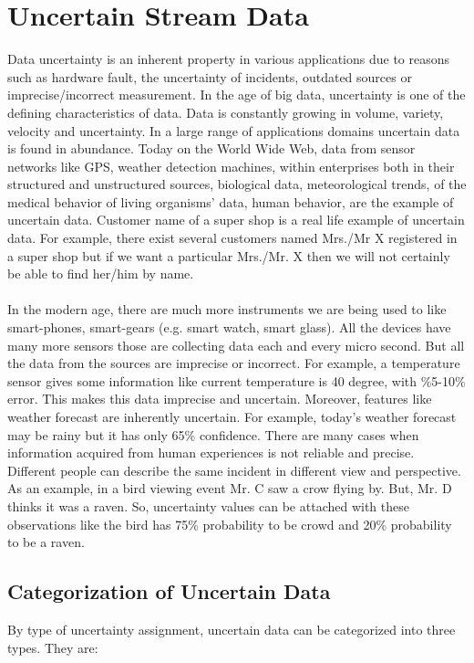 \section{Uncertain Stream Data}
Data uncertainty is an inherent property in various applications due to reasons such as hardware fault, the uncertainty of incidents, outdated sources or imprecise/incorrect measurement. In the age of big data, uncertainty is one of the defining characteristics of data. Data is constantly growing in volume, variety, velocity and uncertainty. In a large range of applications domains uncertain data is found in abundance. Today on the World Wide Web, data from sensor networks like GPS, weather detection machines, within enterprises both in their structured and unstructured sources, biological data, meteorological trends, of the medical behavior of living organisms’ data, human behavior, are the example of uncertain data. Customer name of a super shop is a real life example of uncertain data. For example, there exist several customers named Mrs./Mr X registered in a super shop but if we want a particular Mrs./Mr. X then we will not certainly be able to find her/him by name.\\ \\
In the modern age, there are much more instruments we are being used to like smart-phones, smart-gears (e.g. smart watch, smart glass). All the devices have many more sensors those are collecting data each and every micro second. But all the data from the sources are imprecise or incorrect. For example, a temperature sensor gives some information like current temperature is 40 degree, with \%5-10\% error. This makes this data imprecise and uncertain. Moreover, features like weather forecast are inherently uncertain. For example, today's weather forecast may be rainy but it has only 65\% confidence. There are many cases when information acquired from human experiences is not reliable and precise. Different people can describe the same incident in different view and perspective. As an example, in a bird viewing event Mr. C saw a crow flying by. But, Mr. D thinks it was a raven. So, uncertainty values can be attached with these observations like the bird has 75\% probability to be crowd and 20\% probability to be a raven.

\subsection{Categorization of Uncertain Data}
By type of uncertainty assignment, uncertain data can be categorized into three types. They are:
